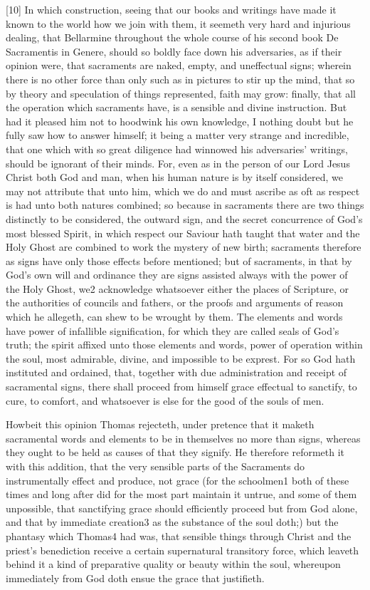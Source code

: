 [10] In which construction, seeing that our books and writings have made it known to the world how we join with them, it seemeth very hard and injurious dealing, that Bellarmine throughout the whole course of his second book De Sacramentis in Genere, should so boldly face down his adversaries, as if their opinion were, that sacraments are naked, empty, and uneffectual signs; wherein there is no other force than only such as in pictures to stir up the mind, that so by theory and speculation of things represented, faith may grow: finally, that all the operation which sacraments  have, is a sensible and divine instruction. But had it pleased him not to hoodwink his own knowledge, I nothing doubt but he fully saw how to answer himself; it being a matter very strange and incredible, that one which with so great diligence had winnowed his adversaries’ writings, should be ignorant of their minds. For, even as in the person of our Lord Jesus Christ both God and man, when his human nature is by itself considered, we may not attribute that unto him, which we do and must ascribe as oft as respect is had unto both natures combined; so because in sacraments there are two things distinctly to be considered, the outward sign, and the secret concurrence of God’s most blessed Spirit, in which respect our Saviour hath taught that water and the Holy Ghost are combined to work the mystery of new birth; sacraments therefore as signs have only those effects before mentioned; but of sacraments, in that by God’s own will and ordinance they are signs assisted always with the power of the Holy Ghost, we2 acknowledge whatsoever either the places of Scripture, or the authorities of councils and fathers, or the proofs and arguments of reason which he allegeth, can shew to be wrought by them. The elements and words have power of infallible signification, for which they are called seals of God’s truth; the spirit affixed unto those elements and words, power of operation within the soul, most admirable, divine, and impossible to be exprest. For so God hath instituted and ordained, that, together with due administration and receipt of sacramental signs, there shall proceed from himself grace effectual to sanctify, to cure, to comfort, and whatsoever is else for the good of the souls of men.

Howbeit this opinion Thomas rejecteth, under pretence that it maketh sacramental words and elements to be in themselves no more than signs, whereas they ought to be held as causes of that they signify. He therefore reformeth  it with this addition, that the very sensible parts of the Sacraments do instrumentally effect and produce, not grace (for the schoolmen1 both of these times and long after did for the most part maintain it untrue, and some of them unpossible, that sanctifying grace should efficiently proceed but from God alone, and that by immediate creation3 as the substance of the soul doth;) but the phantasy which Thomas4 had was, that sensible things through Christ and the priest’s benediction receive a certain supernatural transitory force, which leaveth behind it a kind of preparative quality or beauty within the soul, whereupon immediately from God doth ensue the grace that justifieth.

